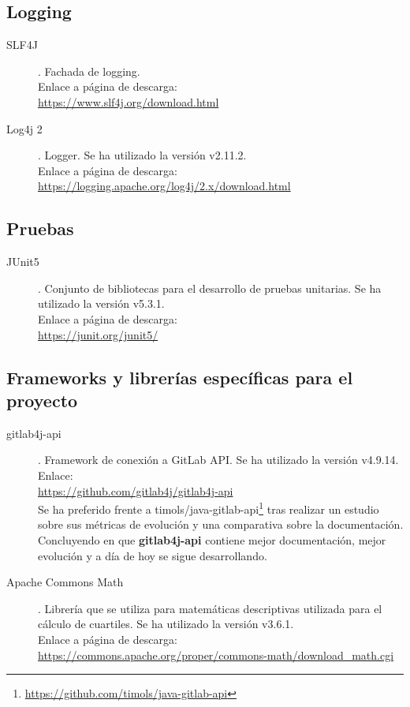 \subsection{Logging}
\begin{description}
	\item[SLF4J]. Fachada de logging.\\ Enlace a página de descarga:\\ \url{https://www.slf4j.org/download.html}
	\item[Log4j 2]. Logger. Se ha utilizado la versión  v2.11.2.\\ Enlace a página de descarga:\\ \url{https://logging.apache.org/log4j/2.x/download.html}
\end{description}
\subsection{Pruebas}
\begin{description}
	\item[JUnit5]. Conjunto de bibliotecas para el desarrollo de pruebas unitarias. Se ha utilizado la versión  v5.3.1.\\ Enlace a página de descarga:\\ \url{https://junit.org/junit5/}
\end{description}
\subsection{Frameworks y librerías específicas para el proyecto}
\begin{description}
	\item[gitlab4j-api]. Framework de conexión a GitLab API. Se ha utilizado la versión  v4.9.14.\\ Enlace:\\ \url{https://github.com/gitlab4j/gitlab4j-api}\\
	Se ha preferido frente a timols/java-gitlab-api\footnote{\url{https://github.com/timols/java-gitlab-api}} tras realizar un estudio sobre sus métricas de evolución y una comparativa sobre la documentación. Concluyendo en que \textbf{gitlab4j-api} contiene mejor documentación, mejor evolución y a día de hoy se sigue desarrollando.
	\item[Apache Commons Math]. Librería que se utiliza para matemáticas descriptivas utilizada para el cálculo de cuartiles. Se ha utilizado la versión  v3.6.1.\\ Enlace a página de descarga:\\ \url{https://commons.apache.org/proper/commons-math/download_math.cgi}
\end{description}
